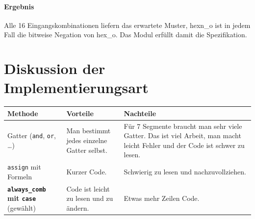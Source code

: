 \documentclass[11pt,a4paper]{article}
\begin{document}
\paragraph{Ergebnis} Alle 16 Eingangskombinationen liefern das erwartete Muster,
hexn\_o ist in jedem Fall die bitweise Negation von hex\_o.
Das Modul erfüllt damit die Spezifikation.

\section{Diskussion der Implementierungsart}
\begin{tabular}{>{\raggedright}p{3.4cm}>{\raggedright}p{5.8cm}>{\raggedright\arraybackslash}p{5.8cm}}
\toprule
Methode & Vorteile & Nachteile \\ \midrule
Gatter (\texttt{and}, \texttt{or}, \dots) &
Man bestimmt jedes einzelne Gatter selbst. &
Für 7 Segmente braucht man sehr viele Gatter. Das ist viel Arbeit, man macht leicht
Fehler und der Code ist schwer zu lesen. \\[1mm]
\texttt{assign} mit Formeln &
Kurzer Code. &
Schwierig zu lesen und nachzuvollziehen. \\[1mm]
\textbf{\texttt{always\_comb} mit \texttt{case}} (gewählt) &
Code ist leicht zu lesen und zu ändern. &
Etwas mehr Zeilen Code. \\
\bottomrule
\end{tabular}

\medskip
\end{document}
